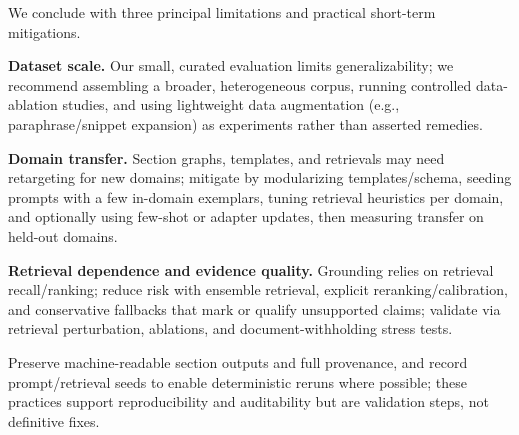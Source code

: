 We conclude with three principal limitations and practical short-term mitigations.

\textbf{Dataset scale.} Our small, curated evaluation limits generalizability; we recommend assembling a broader, heterogeneous corpus, running controlled data-ablation studies, and using lightweight data augmentation (e.g., paraphrase/snippet expansion) as experiments rather than asserted remedies.  

\textbf{Domain transfer.} Section graphs, templates, and retrievals may need retargeting for new domains; mitigate by modularizing templates/schema, seeding prompts with a few in-domain exemplars, tuning retrieval heuristics per domain, and optionally using few-shot or adapter updates, then measuring transfer on held-out domains.  

\textbf{Retrieval dependence and evidence quality.} Grounding relies on retrieval recall/ranking; reduce risk with ensemble retrieval, explicit reranking/calibration, and conservative fallbacks that mark or qualify unsupported claims; validate via retrieval perturbation, ablations, and document-withholding stress tests.  

Preserve machine-readable section outputs and full provenance, and record prompt/retrieval seeds to enable deterministic reruns where possible; these practices support reproducibility and auditability but are validation steps, not definitive fixes.